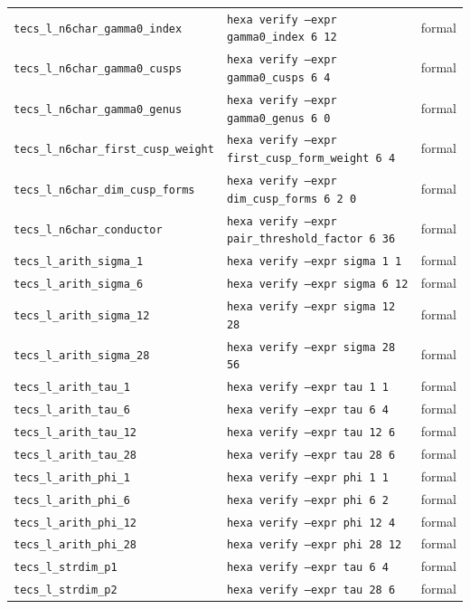 \documentclass[11pt,a4paper]{article}
\theoremstyle{definition}
\begin{document}
\begin{longtable}{lll}
\texttt{tecs\_l\_n6char\_gamma0\_index} & \texttt{hexa verify --expr gamma0\_index 6 12} & formal \\
\texttt{tecs\_l\_n6char\_gamma0\_cusps} & \texttt{hexa verify --expr gamma0\_cusps 6 4} & formal \\
\texttt{tecs\_l\_n6char\_gamma0\_genus} & \texttt{hexa verify --expr gamma0\_genus 6 0} & formal \\
\texttt{tecs\_l\_n6char\_first\_cusp\_weight} & \texttt{hexa verify --expr first\_cusp\_form\_weight 6 4} & formal \\
\texttt{tecs\_l\_n6char\_dim\_cusp\_forms} & \texttt{hexa verify --expr dim\_cusp\_forms 6 2 0} & formal \\
\texttt{tecs\_l\_n6char\_conductor} & \texttt{hexa verify --expr pair\_threshold\_factor 6 36} & formal \\
\texttt{tecs\_l\_arith\_sigma\_1} & \texttt{hexa verify --expr sigma 1 1} & formal \\
\texttt{tecs\_l\_arith\_sigma\_6} & \texttt{hexa verify --expr sigma 6 12} & formal \\
\texttt{tecs\_l\_arith\_sigma\_12} & \texttt{hexa verify --expr sigma 12 28} & formal \\
\texttt{tecs\_l\_arith\_sigma\_28} & \texttt{hexa verify --expr sigma 28 56} & formal \\
\texttt{tecs\_l\_arith\_tau\_1} & \texttt{hexa verify --expr tau 1 1} & formal \\
\texttt{tecs\_l\_arith\_tau\_6} & \texttt{hexa verify --expr tau 6 4} & formal \\
\texttt{tecs\_l\_arith\_tau\_12} & \texttt{hexa verify --expr tau 12 6} & formal \\
\texttt{tecs\_l\_arith\_tau\_28} & \texttt{hexa verify --expr tau 28 6} & formal \\
\texttt{tecs\_l\_arith\_phi\_1} & \texttt{hexa verify --expr phi 1 1} & formal \\
\texttt{tecs\_l\_arith\_phi\_6} & \texttt{hexa verify --expr phi 6 2} & formal \\
\texttt{tecs\_l\_arith\_phi\_12} & \texttt{hexa verify --expr phi 12 4} & formal \\
\texttt{tecs\_l\_arith\_phi\_28} & \texttt{hexa verify --expr phi 28 12} & formal \\
\texttt{tecs\_l\_strdim\_p1} & \texttt{hexa verify --expr tau 6 4} & formal \\
\texttt{tecs\_l\_strdim\_p2} & \texttt{hexa verify --expr tau 28 6} & formal \\

\end{longtable}
\end{document}
